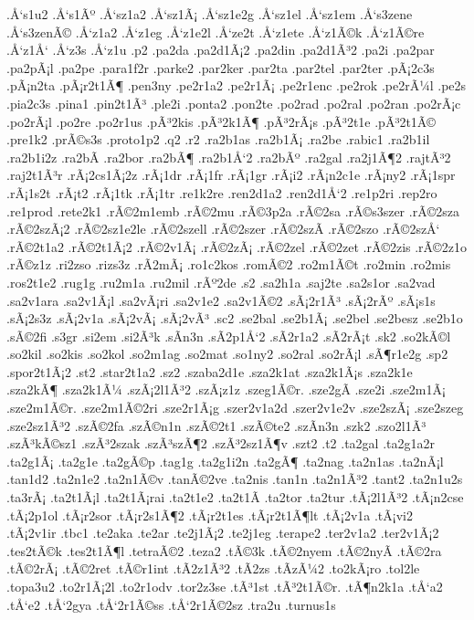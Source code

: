 {.Å‘s1u2
.Å‘s1Ãº
.Å‘sz1a2
.Å‘sz1Ã¡
.Å‘sz1e2g
.Å‘sz1el
.Å‘sz1em
.Å‘s3zene
.Å‘s3zenÃ©
.Å‘z1a2
.Å‘z1eg
.Å‘z1e2l
.Å‘ze2t
.Å‘z1ete
.Å‘z1Ã©k
.Å‘z1Ã©re
.Å‘z1Å‘
.Å‘z3s
.Å‘z1u
.p2
.pa2da
.pa2d1Ã¡2
.pa2din
.pa2d1Ã³2
.pa2i
.pa2par
.pa2pÃ¡l
.pa2pe
.para1f2r
.parke2
.par2ker
.par2ta
.par2tel
.par2ter
.pÃ¡2c3s
.pÃ¡n2ta
.pÃ¡r2t1Ã¶
.pen3ny
.pe2r1a2
.pe2r1Ã¡
.pe2r1enc
.pe2rok
.pe2rÃ¼l
.pe2s
.pia2c3s
.pina1
.pin2t1Ã³
.ple2i
.ponta2
.pon2te
.po2rad
.po2ral
.po2ran
.po2rÃ¡c
.po2rÃ¡l
.po2re
.po2r1us
.pÃ³2kis
.pÃ³2k1Ã¶
.pÃ³2rÃ¡s
.pÃ³2t1e
.pÃ³2t1Ã©
.pre1k2
.prÃ©s3s
.proto1p2
.q2
.r2
.ra2b1as
.ra2b1Ã¡
.ra2be
.rabic1
.ra2b1il
.ra2b1i2z
.ra2bÃ­
.ra2bor
.ra2bÃ¶
.ra2b1Å‘2
.ra2bÃº
.ra2gal
.ra2j1Ã¶2
.rajtÃ³2
.raj2t1Ã³r
.rÃ¡2cs1Ã¡2z
.rÃ¡1dr
.rÃ¡1fr
.rÃ¡1gr
.rÃ¡i2
.rÃ¡n2c1e
.rÃ¡ny2
.rÃ¡1spr
.rÃ¡1s2t
.rÃ¡t2
.rÃ¡1tk
.rÃ¡1tr
.re1k2re
.ren2d1a2
.ren2d1Å‘2
.re1p2ri
.rep2ro
.re1prod
.rete2k1
.rÃ©2m1emb
.rÃ©2mu
.rÃ©3p2a
.rÃ©2sa
.rÃ©s3szer
.rÃ©2sza
.rÃ©2szÃ¡2
.rÃ©2sz1e2le
.rÃ©2szell
.rÃ©2szer
.rÃ©2szÃ­
.rÃ©2szo
.rÃ©2szÅ‘
.rÃ©2t1a2
.rÃ©2t1Ã¡2
.rÃ©2v1Ã¡
.rÃ©2zÃ¡
.rÃ©2zel
.rÃ©2zet
.rÃ©2zis
.rÃ©2z1o
.rÃ©z1z
.ri2zso
.rizs3z
.rÃ­2mÃ¡
.ro1c2kos
.romÃ©2
.ro2m1Ã©t
.ro2min
.ro2mis
.ros2t1e2
.rug1g
.ru2m1a
.ru2mil
.rÃº2de
.s2
.sa2h1a
.saj2te
.sa2s1or
.sa2vad
.sa2v1ara
.sa2v1Ã¡l
.sa2vÃ¡ri
.sa2v1e2
.sa2v1Ã©2
.sÃ¡2r1Ã³
.sÃ¡2rÃº
.sÃ¡s1s
.sÃ¡2s3z
.sÃ¡2v1a
.sÃ¡2vÃ¡
.sÃ¡2vÃ³
.sc2
.se2bal
.se2b1Ã¡
.se2bel
.se2besz
.se2b1o
.sÃ©2fi
.s3gr
.si2em
.si2Ã³k
.sÃ­n3n
.sÃ­2p1Å‘2
.sÃ­2r1a2
.sÃ­2rÃ¡t
.sk2
.so2kÃ©l
.so2kil
.so2kis
.so2kol
.so2m1ag
.so2mat
.so1ny2
.so2ral
.so2rÃ¡l
.sÃ¶r1e2g
.sp2
.spor2t1Ã¡2
.st2
.star2t1a2
.sz2
.szaba2d1e
.sza2k1at
.sza2k1Ã¡s
.sza2k1e
.sza2kÃ¶
.sza2k1Ã¼
.szÃ¡2l1Ã³2
.szÃ¡z1z
.szeg1Ã©r.
.sze2gÃ­
.sze2i
.sze2m1Ã¡
.sze2m1Ã©r.
.sze2m1Ã©2ri
.sze2r1Ã¡g
.szer2v1a2d
.szer2v1e2v
.sze2szÃ¡
.sze2szeg
.sze2sz1Ã³2
.szÃ©2fa
.szÃ©n1n
.szÃ©2t1
.szÃ©te2
.szÃ­n3n
.szk2
.szo2l1Ã³
.szÃ³kÃ©sz1
.szÃ³2szak
.szÃ³szÃ¶2
.szÃ³2sz1Ã¶v
.szt2
.t2
.ta2gal
.ta2g1a2r
.ta2g1Ã¡
.ta2g1e
.ta2gÃ©p
.tag1g
.ta2g1i2n
.ta2gÃ¶
.ta2nag
.ta2n1as
.ta2nÃ¡l
.tan1d2
.ta2n1e2
.ta2n1Ã©v
.tanÃ©2ve
.ta2nis
.tan1n
.ta2n1Ã³2
.tant2
.ta2n1u2s
.ta3rÃ¡
.ta2t1Ã¡l
.ta2t1Ã¡rai
.ta2t1e2
.ta2t1Ã­
.ta2tor
.ta2tur
.tÃ¡2l1Ã³2
.tÃ¡n2cse
.tÃ¡2p1ol
.tÃ¡r2sor
.tÃ¡r2s1Ã¶2
.tÃ¡r2t1es
.tÃ¡r2t1Ã¶lt
.tÃ¡2v1a
.tÃ¡vi2
.tÃ¡2v1ir
.tbc1
.te2aka
.te2ar
.te2j1Ã¡2
.te2j1eg
.terape2
.ter2v1a2
.ter2v1Ã¡2
.tes2tÃ©k
.tes2t1Ã¶l
.tetraÃ©2
.teza2
.tÃ©3k
.tÃ©2nyem
.tÃ©2nyÃ­
.tÃ©2ra
.tÃ©2rÃ¡
.tÃ©2ret
.tÃ©r1int
.tÃ­2z1Ã³2
.tÃ­2zs
.tÃ­zÃ¼2
.to2kÃ¡ro
.tol2le
.topa3u2
.to2r1Ã¡2l
.to2r1odv
.tor2z3se
.tÃ³1st
.tÃ³2t1Ã©r.
.tÃ¶n2k1a
.tÅ‘a2
.tÅ‘e2
.tÅ‘2gya
.tÅ‘2r1Ã©ss
.tÅ‘2r1Ã©2sz
.tra2u
.turnus1s
}
